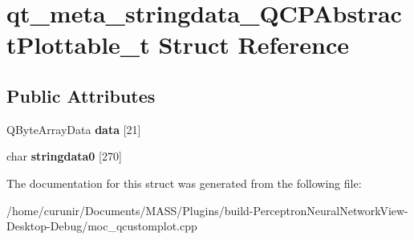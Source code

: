 \hypertarget{structqt__meta__stringdata___q_c_p_abstract_plottable__t}{}\section{qt\+\_\+meta\+\_\+stringdata\+\_\+\+Q\+C\+P\+Abstract\+Plottable\+\_\+t Struct Reference}
\label{structqt__meta__stringdata___q_c_p_abstract_plottable__t}
\subsection*{Public Attributes}
\begin{DoxyCompactItemize}
\item 
Q\+Byte\+Array\+Data {\bfseries data} \mbox{[}21\mbox{]}\hypertarget{structqt__meta__stringdata___q_c_p_abstract_plottable__t_aaf0620f4cc407349bff54eddf41fef33}{}\label{structqt__meta__stringdata___q_c_p_abstract_plottable__t_aaf0620f4cc407349bff54eddf41fef33}

\item 
char {\bfseries stringdata0} \mbox{[}270\mbox{]}\hypertarget{structqt__meta__stringdata___q_c_p_abstract_plottable__t_a397cb51ceb93b62e1fb7a828768255e4}{}\label{structqt__meta__stringdata___q_c_p_abstract_plottable__t_a397cb51ceb93b62e1fb7a828768255e4}

\end{DoxyCompactItemize}


The documentation for this struct was generated from the following file\+:\begin{DoxyCompactItemize}
\item 
/home/curunir/\+Documents/\+M\+A\+S\+S/\+Plugins/build-\/\+Perceptron\+Neural\+Network\+View-\/\+Desktop-\/\+Debug/moc\+\_\+qcustomplot.\+cpp\end{DoxyCompactItemize}
